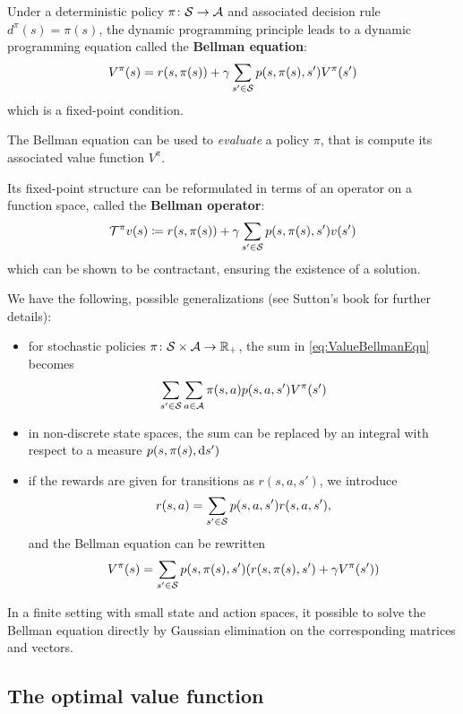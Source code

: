 \documentclass[../course-notes.tex]{subfiles}
\begin{document}
Under a deterministic policy $\pi\colon \mathcal{S} \to \mathcal{A}$ and associated decision rule $d^\pi(s) = \pi(s)$, the dynamic programming principle leads to a dynamic programming equation called the \textbf{\bluefont Bellman equation}:
\begin{equation}\label{eq:ValueBellmanEqn}
V^\pi(s) = r(s, \pi(s)) + \gamma\sum_{s'\in\mathcal{S}} p(s, \pi(s), s')V^\pi(s')
\end{equation}
which is a fixed-point condition.

The Bellman equation can be used to \textit{evaluate} a policy $\pi$, that is compute its associated value function $V^\pi$.

Its fixed-point structure can be reformulated in terms of an operator on a function space, called the \textbf{Bellman operator}:
\[
\mathcal{T}^\pi v(s) \coloneqq
r(s,\pi(s)) + \gamma\sum_{s'\in\mathcal{S}}p(s,\pi(s),s') v(s')
\]
which can be shown to be contractant, ensuring the existence of a solution.


\begin{remark}
	We have the following, possible generalizations (see Sutton's book \cite[][chap.\ 3,4]{Sutton1998} for further details):
	\begin{itemize}
		\item for stochastic policies $\pi\colon \mathcal{S}\times\mathcal{A} \to \mathbb{R}_+$, the sum in \cref{eq:ValueBellmanEqn} becomes 
		\[
		\sum_{s'\in\mathcal{S}} \sum_{a\in\mathcal{A}} \pi(s,a) p(s,a,s')V^\pi(s')
		\]
		\item in non-discrete state spaces, the sum can be replaced by an integral with respect to a measure $p(s,\pi(s),\operatorname{d\!}{} s')$
		\item if the rewards are given for transitions as $r(s,a,s')$, we introduce
		\[
			r(s,a) = \sum_{s'\in\mathcal{S}} p(s,a,s') r(s,a,s'),
		\]
		and the Bellman equation can be rewritten
		\[
		V^\pi(s) = \sum_{s'\in\mathcal{S}} p(s,\pi(s),s')
		(r(s,\pi(s),s') + \gamma V^\pi(s'))
		\]
	\end{itemize}
\end{remark}


In a finite setting with small state and action spaces, it possible to solve the Bellman equation directly by Gaussian elimination on the corresponding matrices and vectors.



\subsection{The optimal value function}\label{sec:OptimalValueFunc}
\end{document}
